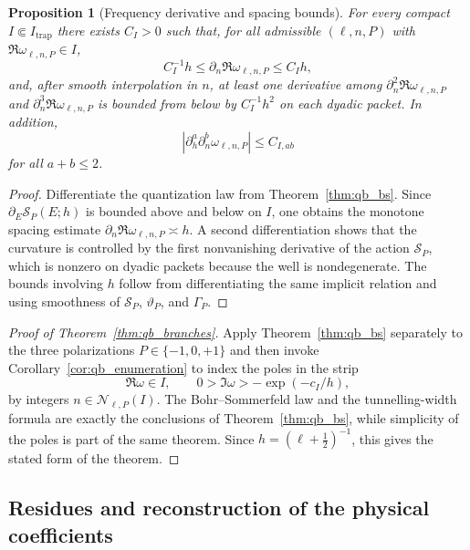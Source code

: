 \documentclass[12pt]{article}
\numberwithin{equation}{section}
\theoremstyle{plain}
\newtheorem{proposition}[theorem]{Proposition}
\theoremstyle{definition}
\theoremstyle{remark}
\newcommand{\abs}[1]{\left|#1\right|}
\begin{document}
\begin{proposition}[Frequency derivative and spacing bounds]\label{prop:qb_frequency_derivatives}
For every compact $I\Subset I_{\mathrm{trap}}$ there exists $C_I>0$ such that, for all admissible $(\ell,n,P)$ with $\Re\omega_{\ell,n,P}\in I$,
\[
   C_I^{-1}h\le \partial_n\Re\omega_{\ell,n,P}\le C_I h,
\]
and, after smooth interpolation in $n$, at least one derivative among $\partial_n^2\Re\omega_{\ell,n,P}$ and $\partial_n^3\Re\omega_{\ell,n,P}$ is bounded from below by $C_I^{-1}h^2$ on each dyadic packet.  In addition,
\[
   \abs{\partial_h^a\partial_n^b\omega_{\ell,n,P}}\le C_{I,ab}
\]
for all $a+b\le2$.
\end{proposition}

\begin{proof}
Differentiate the quantization law from Theorem~\ref{thm:qb_bs}.  Since $\partial_E\mathscr S_P(E;h)$ is bounded above and below on $I$, one obtains the monotone spacing estimate $\partial_n\Re\omega_{\ell,n,P}\asymp h$.  A second differentiation shows that the curvature is controlled by the first nonvanishing derivative of the action $\mathscr S_P$, which is nonzero on dyadic packets because the well is nondegenerate.  The bounds involving $h$ follow from differentiating the same implicit relation and using smoothness of $\mathscr S_P$, $\vartheta_P$, and $\Gamma_P$.
\end{proof}

\begin{proof}[Proof of Theorem~\ref{thm:qb_branches}]
Apply Theorem~\ref{thm:qb_bs} separately to the three polarizations $P\in\{-1,0,+1\}$ and then invoke Corollary~\ref{cor:qb_enumeration} to index the poles in the strip
\[
   \Re\omega\in I,
   \qquad
   0>\Im\omega>-\exp(-c_I/h),
\]
by integers $n\in\mathcal N_{\ell,P}(I)$.  The Bohr--Sommerfeld law and the tunnelling-width formula are exactly the conclusions of Theorem~\ref{thm:qb_bs}, while simplicity of the poles is part of the same theorem.  Since $h=(\ell+\tfrac12)^{-1}$, this gives the stated form of the theorem.
\end{proof}

\subsection{Residues and reconstruction of the physical coefficients}
\end{document}
